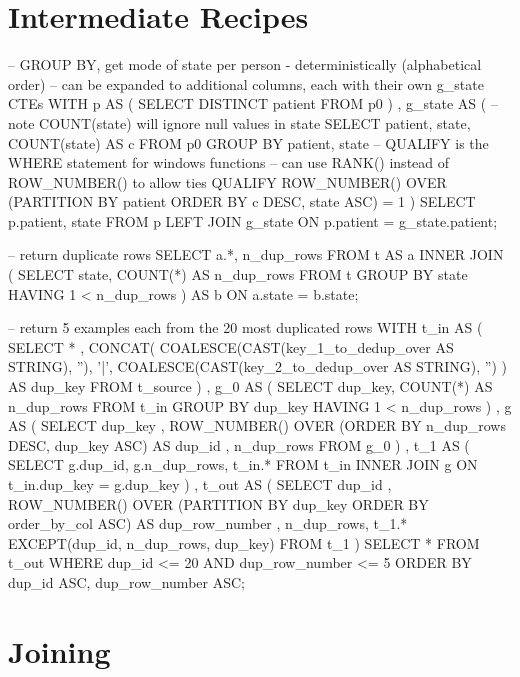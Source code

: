 \section{Intermediate Recipes}
\label{ssql:intermediate_recipes}

\begin{SQLcode}
-- GROUP BY, get mode of state per person - deterministically (alphabetical order)
-- can be expanded to additional columns, each with their own g_state CTEs
WITH p AS ( SELECT DISTINCT patient FROM p0 )
, g_state AS (
	-- note COUNT(state) will ignore null values in state
	SELECT patient, state, COUNT(state) AS c
	FROM p0 GROUP BY patient, state
	-- QUALIFY is the WHERE statement for windows functions
	-- can use RANK() instead of ROW_NUMBER() to allow ties
	QUALIFY ROW_NUMBER() OVER (PARTITION BY patient ORDER BY c DESC, state ASC) = 1
)
SELECT p.patient, state
FROM p
LEFT JOIN g_state ON p.patient = g_state.patient;

-- return duplicate rows
SELECT a.*, n_dup_rows
FROM t AS a
INNER JOIN (
	SELECT state, COUNT(*) AS n_dup_rows
	FROM t
	GROUP BY state
	HAVING 1 < n_dup_rows
) AS b
	ON a.state = b.state;

-- return 5 examples each from the 20 most duplicated rows
WITH t_in AS (
	SELECT *
		, CONCAT(
			COALESCE(CAST(key_1_to_dedup_over AS STRING), ''),
			'|',
			COALESCE(CAST(key_2_to_dedup_over AS STRING), '')
		) AS dup_key
	FROM t_source
)
, g_0 AS (
	SELECT dup_key, COUNT(*) AS n_dup_rows
	FROM t_in
	GROUP BY dup_key
	HAVING 1 < n_dup_rows
)
, g AS (
	SELECT dup_key
		, ROW_NUMBER() OVER (ORDER BY n_dup_rows DESC, dup_key ASC) AS dup_id
		, n_dup_rows
	FROM g_0
)
, t_1 AS (
	SELECT g.dup_id, g.n_dup_rows, t_in.*
	FROM t_in
	INNER JOIN g
		ON t_in.dup_key = g.dup_key
)
, t_out AS (
	SELECT dup_id
		, ROW_NUMBER() OVER (PARTITION BY dup_key ORDER BY order_by_col ASC) AS dup_row_number
		, n_dup_rows, t_1.* EXCEPT(dup_id, n_dup_rows, dup_key)
	FROM t_1
)
SELECT *
FROM t_out
WHERE dup_id <= 20 AND dup_row_number <= 5
ORDER BY dup_id ASC, dup_row_number ASC;
\end{SQLcode}

\section{Joining}
\label{sql:join}

